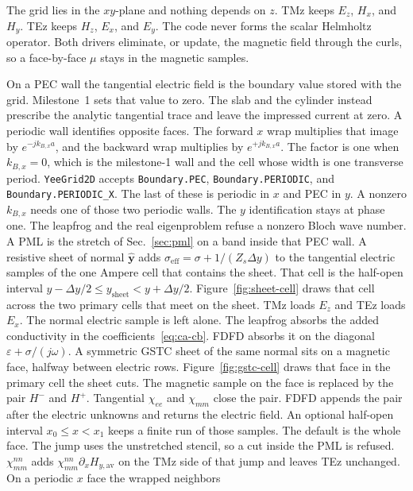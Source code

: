 \documentclass[11pt,a4paper]{article}
\begin{document}
The grid lies in the $xy$-plane and nothing depends on $z$. TMz keeps
$E_z$, $H_x$, and $H_y$. TEz keeps $H_z$, $E_x$, and $E_y$. The code never
forms the scalar Helmholtz operator. Both drivers eliminate, or update, the
magnetic field through the curls, so a face-by-face $\mu$ stays in the
magnetic samples.

On a PEC wall the tangential electric field is the boundary value stored
with the grid. Milestone~1 sets that value to zero. The slab and the
cylinder instead prescribe the analytic tangential trace and leave the
impressed current at zero. A periodic wall identifies opposite faces.
The forward $x$ wrap multiplies that image by $e^{-j k_{B,x} a}$, and
the backward wrap multiplies by $e^{+j k_{B,x} a}$. The factor is one
when $k_{B,x}=0$, which is the milestone-1 wall and the cell whose
width is one transverse period. \texttt{YeeGrid2D} accepts
\texttt{Boundary.PEC}, \texttt{Boundary.PERIODIC}, and
\texttt{Boundary.PERIODIC\_X}. The last of these is periodic in $x$ and
PEC in $y$. A nonzero $k_{B,x}$ needs one of those two periodic walls.
The $y$ identification stays at phase one. The leapfrog and the real
eigenproblem refuse a nonzero Bloch wave number. A PML is the stretch of
Sec.~\ref{sec:pml} on a band inside that PEC wall. A resistive sheet of
normal $\hat{\mathbf{y}}$ adds
$\sigma_{\mathrm{eff}}=\sigma+1/(Z_s\Delta y)$ to the tangential electric
samples of the one Ampere cell that contains the sheet. That cell is the
half-open interval $y-\Delta y/2\le y_{\mathrm{sheet}}<y+\Delta y/2$.
Figure~\ref{fig:sheet-cell} draws that cell across the two primary cells
that meet on the sheet. TMz loads $E_z$ and TEz loads $E_x$. The normal
electric sample is left alone. The leapfrog absorbs the added conductivity in the
coefficients~\eqref{eq:ca-cb}. FDFD absorbs it on the diagonal
$\varepsilon+\sigma/(j\omega)$. A symmetric GSTC sheet of the same normal
sits on a magnetic face, halfway between electric rows.
Figure~\ref{fig:gstc-cell} draws that face in the primary cell the sheet
cuts. The magnetic sample on the face is replaced by the pair $H^-$ and
$H^+$. Tangential $\chi_{ee}$ and $\chi_{mm}$ close the pair. FDFD appends
the pair after the electric unknowns and returns the electric field. An
optional half-open interval $x_0\le x<x_1$ keeps a finite run of those
samples. The default is the whole face. The jump uses the unstretched
stencil, so a cut inside the PML is refused. $\chi_{mm}^{nn}$ adds
$\chi_{mm}^{nn}\partial_x H_{y,\mathrm{av}}$ on the TMz side of that jump
and leaves TEz unchanged. On a periodic $x$ face the wrapped neighbors
\end{document}
